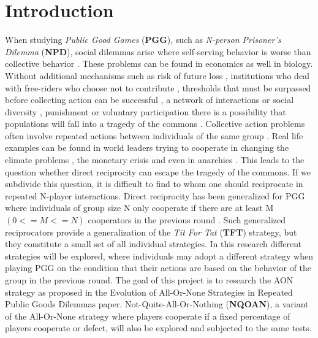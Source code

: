 \documentclass[letterpaper]{article}
\begin{document}
\section{Introduction}
When studying \textit{Public Good Games}  (\textbf{PGG}), such as \textit{N-person Prisoner's Dilemma}  (\textbf{NPD}), social dilemmas arise where self-serving behavior is worse than collective behavior \citep{kollock1998social}. These problems can be found in economics as well in biology.
Without additional mechanisms such as risk of future loss \citep{santos2011risk}, institutions who deal with free-riders who choose not to contribute \citep{vasconcelos2013bottom,sigmund2010social}, thresholds that must be surpassed before collecting action can be successful \citep{pacheco2011evolutionary}, a network of interactions or social diversity \citep{wang2013interdependent,santos2008social}, punishment \citep{fehr2002altruistic,brandt2006punishing} or voluntary participation \citep{hauert2002volunteering} there is a possibility that populations will fall into a tragedy of the commons \citep{hardin1968tragedy}.
Collective action problems often involve repeated actions between individuals of the same group \citep{boyd1988evolution}. Real life examples can be found in world leaders trying to cooperate in changing the climate problems \citep{milinski2008collective,barrett2012climate}, the monetary crisis \citep{jacquet2001economic} and even in anarchies \citep{axelrod1985achieving}. This leads to the question whether direct reciprocity can escape the tragedy of the commons. If we subdivide this question, it is difficult to find to whom one should reciprocate in repeated N-player interactions. Direct reciprocity has been generalized for PGG where individuals of group size N only cooperate if there are at least M $(0<=M<=N)$ cooperators in the previous round \citep{van2012emergence,kurokawa2009emergence}. Such generalized reciprocators provide a generalization of the \textit{Tit For Tat}  (\textbf{TFT}) strategy, but they constitute a small set of all individual strategies.
In this research different strategies will be explored, where individuals may adopt a different strategy when playing PGG on the condition that their actions are based on the behavior of the group in the previous round.
The goal of this project is to research the AON strategy as proposed in the Evolution of All-Or-None Strategies in Repeated Public
Goods Dilemmas \citep{project} paper. Not-Quite-All-Or-Nothing (\textbf{NQOAN}), a variant of the All-Or-None strategy where players cooperate if a fixed percentage of players cooperate or defect, will also be explored and subjected to the same tests.
\end{document}
